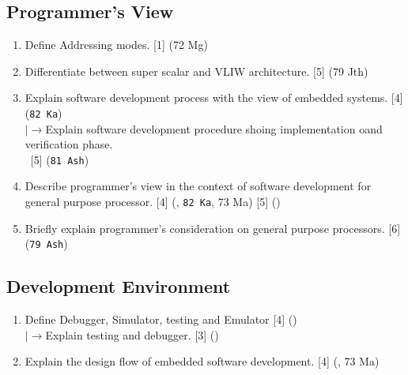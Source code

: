 \documentclass[12pt]{article}
\newcommand{\lb}{\\$\left|\rightarrow\right.$}
\newcommand{\enter}{\\\textcolor{white}{1}}
\begin{document}
  \subsection{Programmer's View}
    \begin{enumerate}[topsep=0pt]
      \item Define Addressing modes. \hfill [1] (72 Mg)

      \item Differentiate between super scalar and VLIW architecture. \hfill [5] (79 Jth)

      \item Explain software development process with the view of embedded systems. \hfill [4] (\texttt{82 Ka})
        \lb Explain software development procedure shoing implementation oand verification phase.
        \enter\hfill [5] (\texttt{81 Ash})

      \item Describe programmer's view in the context of software development for general purpose processor. \hfill [4] (, \texttt{82 Ka}, 73 Ma) [5] ()

      \item Briefly explain programmer's consideration on general purpose processors.  \hfill [6] (\texttt{79 Ash})
    \end{enumerate}

  \subsection{Development Environment}
    \begin{enumerate}[topsep=0pt]
      \item Define Debugger, Simulator, testing and Emulator \hfill [4] ()
      \lb Explain testing and debugger. \hfill [3] ()
      
      \item Explain the design flow of embedded software development. \hfill [4] (, 73 Ma)
    \end{enumerate}
\end{document}
